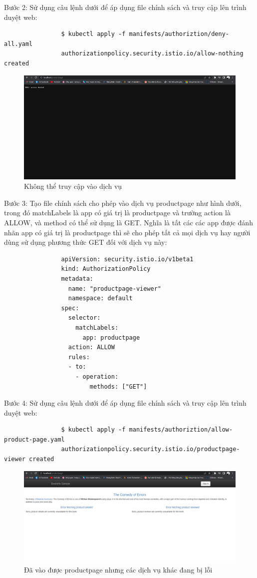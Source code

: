 \documentclass[12pt,a4paper]{report}
\begin{document}
{{				Bước 2: Sử dụng câu lệnh dưới để áp dụng file chính sách và truy cập lên trình duyệt web:
				\begin{lstlisting}
				$ kubectl apply -f manifests/authoriztion/deny-all.yaml 
				authorizationpolicy.security.istio.io/allow-nothing created
				\end{lstlisting}
				\begin{figure}[h]
					\centering
					\includegraphics[width=1\linewidth]{Pics/3.3.2-p1}
					\caption{Không thể truy cập vào dịch vụ}
					\label{fig:3}
				\end{figure}
			
				Bước 3: Tạo file chính sách cho phép vào dịch vụ productpage như hình dưới, trong đó matchLabels là app có giá trị là productpage và trường action là ALLOW, và method có thể sử dụng là GET. Nghĩa là tất các các app được đánh nhãn app có giá trị là productpage thì sẽ cho phép tất cả mọi dịch vụ hay người dùng sử dụng phương thức GET đối với dịch vụ này:
				\begin{lstlisting}
				apiVersion: security.istio.io/v1beta1
				kind: AuthorizationPolicy
				metadata:
				  name: "productpage-viewer"
				  namespace: default
				spec:
				  selector:
				    matchLabels:
				      app: productpage
				  action: ALLOW
				  rules:
				  - to:
				    - operation:
				        methods: ["GET"]
				\end{lstlisting}
				
				Bước 4: Sử dụng câu lệnh dưới để áp dụng file chính sách và truy cập lên trình duyệt web:
				\begin{lstlisting}
				$ kubectl apply -f manifests/authoriztion/allow-product-page.yaml 
				authorizationpolicy.security.istio.io/productpage-viewer created
				\end{lstlisting}
				\begin{figure}[h]
					\centering
					\includegraphics[width=0.7\linewidth]{Pics/3.3.2-p2}
					\caption{Đã vào được productpage nhưng các dịch vụ khác đang bị lỗi}
					\label{fig:3}
				\end{figure}
				
}}
\end{document}

